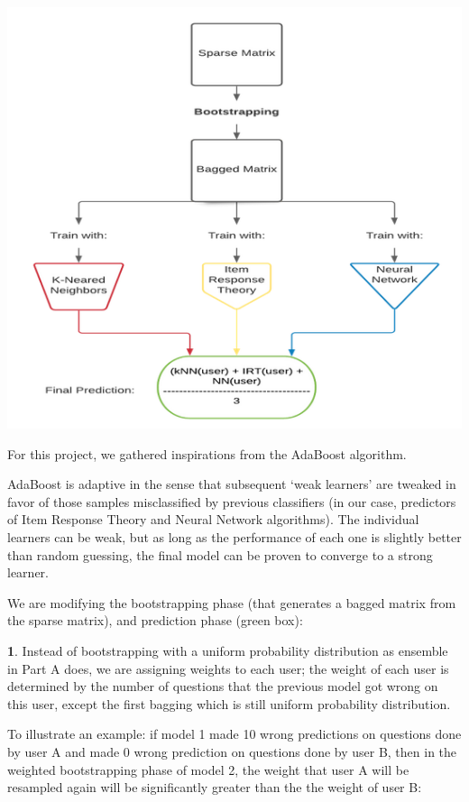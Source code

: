 \documentclass{article}
\begin{document}
    \includegraphics[scale=0.5]{figures/pb_f1.png}
    
    For this project, we gathered inspirations from the AdaBoost algorithm. 

    AdaBoost is adaptive in the sense that subsequent ‘weak learners’ are tweaked in favor of those samples misclassified by previous classifiers (in our case, predictors of Item Response Theory and Neural Network algorithms). The individual learners can be weak, but as long as the performance of each one is slightly better than random guessing, the final model can be proven to converge to a strong learner.
    
    We are modifying the bootstrapping phase (that generates a bagged matrix from the sparse matrix), and prediction phase (green box):

    \textbf{1}. Instead of bootstrapping with a uniform probability distribution as ensemble in Part A does, we are assigning weights to each user; the weight of each user is determined by the number of questions that the previous model got wrong on this user, except the first bagging which is still uniform probability distribution.

    To illustrate an example: if model 1 made 10 wrong predictions on questions done by user A and made 0 wrong prediction on questions done by user B, then in the weighted bootstrapping phase of model 2, the weight that user A will be resampled again will be significantly greater than the the weight of user B:
\end{document}

